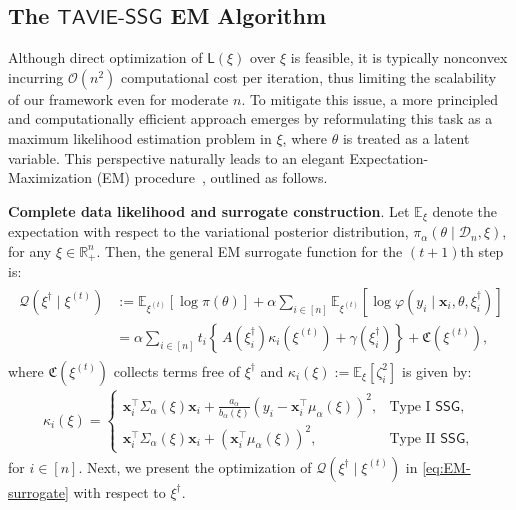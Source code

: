 \documentclass[12pt]{article}
\numberwithin{equation}{section}
\newcommand{\tssg}{\mathsf{TAVIE}\text{-}\mathsf{SSG}}
\begin{document}

\subsection{The \texorpdfstring{$\tssg$}{TAVIE-SSG} EM Algorithm}\label{subsec:tavie-algo}

Although direct optimization of $\mathsf{L}(\xi)$ over $\xi$ is feasible, it is typically nonconvex incurring $\mathcal{O}(n^2)$ computational cost per iteration, thus limiting the scalability of our framework even for moderate $n$. To mitigate this issue, a more principled and computationally efficient approach emerges by reformulating this task as a maximum likelihood estimation problem in $\xi$, where $\theta$ is treated as a latent variable. This perspective naturally leads to an elegant {Expectation-Maximization} (EM) procedure~\citep{EM-Dempster-Laird-Rubin}, outlined as follows.

\textbf{Complete data likelihood and surrogate construction}. Let $\mathbb{E}_{\xi}$ denote the expectation with respect to the variational posterior distribution, $\pi_{\alpha}(\theta \mid \mathcal{D}_n, \xi)$, for any $\xi \in \mathbb{R}^n_{+}$. Then, the general EM surrogate function for the $(t+1)$th step is:
%
\begin{align}\label{eq:EM-surrogate}
\begin{split}
\mathcal{Q}(\xi^{\dagger} \mid \xi^{(t)}) 
&:= \mathbb{E}_{\xi^{(t)}} \left[\log \pi(\theta)\right] + \alpha \sum_{i\in[n]} \mathbb{E}_{\xi^{(t)}} \left[\log \varphi(y_i \mid \mathbf{x}_i, \theta, \xi^{\dagger}_i) \right] \\
&= \alpha \sum_{i\in[n]} t_i\left\{\,A(\xi_i^{\dagger}) \kappa_i(\xi^{(t)}) + \gamma(\xi_i^{\dagger})\right\} + \mathfrak{C}(\xi^{(t)}),
\end{split}
\end{align}
%
where $\mathfrak{C}(\xi^{(t)})$ collects terms free of $\xi^{\dagger}$ and $\kappa_i(\xi) := \mathbb{E}_{\xi} \left[\zeta_i^2\right]$ is given by:
\begin{align}\label{eq:kappa-Type-I-II}
    \kappa_i(\xi) 
    = \begin{cases}
        \mathbf{x}_i^{\top}\Sigma_{\alpha}(\xi) \mathbf{x}_i + \frac{a_\alpha}{b_{\alpha}(\xi)}\left(y_i - \mathbf{x}_{i}^{\top}\mu_{\alpha}(\xi)\right)^2, &\text{Type I } \mathsf{SSG},\\
        \mathbf{x}_i^{\top}\Sigma_{\alpha}(\xi)\mathbf{x}_i + \left(\mathbf{x}_i^{\top}\mu_{\alpha}(\xi)\right)^{2}, & \text{Type II } \mathsf{SSG},
    \end{cases}
\end{align}
for $i\in [n]$.
Next, we present the optimization of $\mathcal{Q}(\xi^{\dagger}\mid \xi^{(t)})$ in \eqref{eq:EM-surrogate} with respect to $\xi^{\dagger}$.
\end{document}
